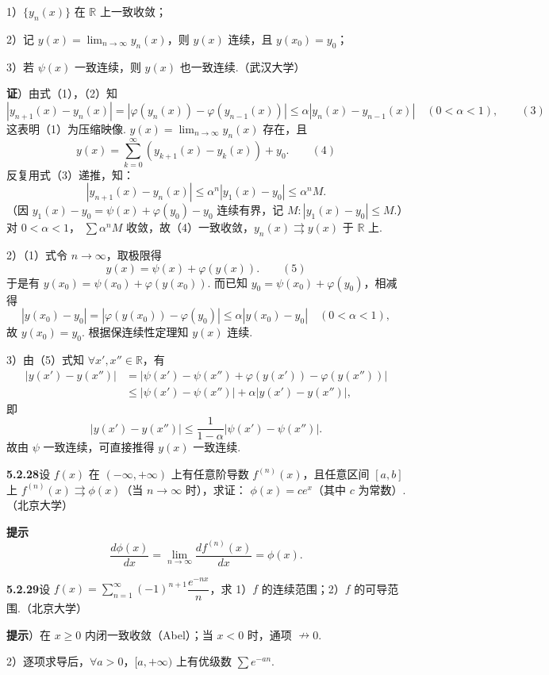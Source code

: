 \documentclass[UTF8, 12pt, fontset=fandol, oneside]{ctexart}
\begin{document}
1）$\{y_n(x)\}$ 在 $\mathbb R$ 上一致收敛；

2）记 $y(x)=\displaystyle\lim_{n\to\infty}y_n(x)$，则 $y(x)$ 连续，且 $y(x_0)=y_0$；

3）若 $\psi(x)$ 一致连续，则 $y(x)$ 也一致连续.（武汉大学）

\noindent\textbf{证}）由式（1），（2）知
\[
  |y_{n+1}(x)-y_n(x)|
  =|\varphi(y_n(x))-\varphi(y_{n-1}(x))|
  \le\alpha|y_n(x)-y_{n-1}(x)|\quad(0<\alpha<1),
\qquad(3)
\]
这表明（1）为压缩映像. $y(x)=\displaystyle\lim_{n\to\infty}y_n(x)$ 存在，且
\[
  y(x)=\sum_{k=0}^{\infty}(y_{k+1}(x)-y_k(x))+y_0.
\qquad(4)
\]
反复用式（3）递推，知：
\[
  |y_{n+1}(x)-y_n(x)|\le\alpha^n|y_1(x)-y_0|\le\alpha^n M.
\]
（因 $y_1(x)-y_0=\psi(x)+\varphi(y_0)-y_0$ 连续有界，记
$M:|y_1(x)-y_0|\le M$.）对 $0<\alpha<1$，
$\displaystyle\sum\alpha^nM$ 收敛，故（4）一致收敛，$y_n(x)\rightrightarrows y(x)$ 于
$\mathbb R$ 上.

2）（1）式令 $n\to\infty$，取极限得
\[
  y(x)=\psi(x)+\varphi(y(x)).
\qquad(5)
\]
于是有 $y(x_0)=\psi(x_0)+\varphi(y(x_0))$. 而已知
$y_0=\psi(x_0)+\varphi(y_0)$，相减得
\[
  |y(x_0)-y_0|=|\varphi(y(x_0))-\varphi(y_0)|
  \le\alpha|y(x_0)-y_0|\quad(0<\alpha<1),
\]
故 $y(x_0)=y_0$. 根据保连续性定理知 $y(x)$ 连续.

3）由（5）式知 $\forall x',x''\in\mathbb R$，有
\[
\begin{aligned}
|y(x')-y(x'')|
&=|\psi(x')-\psi(x'')+\varphi(y(x'))-\varphi(y(x''))|\\
&\le|\psi(x')-\psi(x'')|+\alpha|y(x')-y(x'')|,
\end{aligned}
\]
即
\[
  |y(x')-y(x'')|\le\frac1{1-\alpha}|\psi(x')-\psi(x'')|.
\]
故由 $\psi$ 一致连续，可直接推得 $y(x)$ 一致连续.

\noindent\textbf{5.2.28}\quad 设 $f(x)$ 在 $(-\infty,+\infty)$ 上有任意阶导数 $f^{(n)}(x)$，且任意区间 $[a,b]$ 上
$f^{(n)}(x)\rightrightarrows\phi(x)$（当 $n\to\infty$ 时），求证：
$\phi(x)=ce^x$（其中 $c$ 为常数）.（北京大学）

\noindent\textbf{提示}\quad
\[
  \frac{d\phi(x)}{dx}
  =\lim_{n\to\infty}\frac{df^{(n)}(x)}{dx}
  =\phi(x).
\]

\noindent\textbf{5.2.29}\quad 设
$f(x)=\displaystyle\sum_{n=1}^{\infty}(-1)^{n+1}\dfrac{e^{-nx}}n$，求 1）$f$ 的连续范围；2）$f$ 的可导范围.（北京大学）

\noindent\textbf{提示}）在 $x\ge0$ 内闭一致收敛（Abel）；当 $x<0$ 时，通项 $\nrightarrow0$.

2）逐项求导后，$\forall a>0$，$[a,+\infty)$ 上有优级数 $\displaystyle\sum e^{-an}$.
\end{document}
